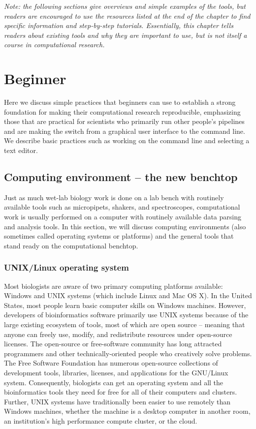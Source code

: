 \documentclass[ChapterTOCs,krantz2]{krantz} %
\newcommand{\unix}{UNIX}
\begin{document}
\textsl{Note: the following sections give overviews and simple examples of the tools, 
but readers are encouraged to use the resources listed at the end of
the chapter to find specific information and step-by-step tutorials.  Essentially, 
this chapter tells readers about existing tools and why they are important to use, 
but is not itself a course in computational research.}

\section{Beginner} Here we discuss simple practices that beginners can use
to establish a strong foundation for making their computational research
reproducible, emphasizing those that are practical for scientists who primarily
run other people's pipelines and are making the switch from a graphical user
interface to the command line. We describe basic practices such as working
on the command line and selecting a text editor.  

\subsection{Computing environment -- the new benchtop}

Just as much wet-lab biology work is done on a lab bench with routinely available tools
such as micropipets, shakers, and spectroscopes, computational work
is usually performed on a computer with routinely available data parsing and analysis tools.  
In this section, we will discuss computing environments (also
sometimes called operating systems or platforms) and the general tools that
stand ready on the computational benchtop.  

\subsubsection{\unix{}/Linux operating system}

Most biologists are aware of two primary computing platforms available:
Windows and \unix{} systems (which include Linux and Mac OS X). 
In the United States, most people
learn basic computer skills on Windows machines.  
However, developers of bioinformatics
software primarily use \unix{} systems because of the large existing ecosystem
of tools, most of which are open source -- meaning that anyone can freely use, modify, and
redistribute resources under open-source licenses.  The open-source or 
free-software community has long attracted programmers and other 
technically-oriented people who creatively solve problems.
The Free Software Foundation\cite{FSF} has numerous 
open-source collections of development
tools, libraries, licenses, and applications for the GNU/Linux system.
Consequently, biologists can get an operating system and all the bioinformatics
tools they need for free for all of their computers and clusters.  
Further, \unix{} systems have traditionally been easier to use remotely than Windows
machines, whether
the machine is a desktop computer 
in another room, an institution's high performance compute cluster, or 
the cloud.
\end{document}
